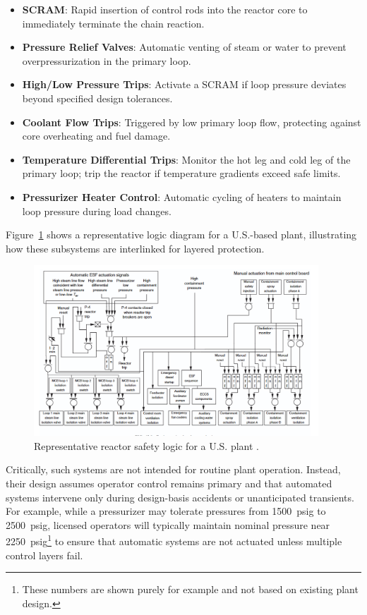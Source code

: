 \documentclass[12pt]{article}
\begin{document}
\begin{itemize}
  \item \textbf{SCRAM}: Rapid insertion of control rods into the reactor core to immediately terminate the chain reaction.
  \item \textbf{Pressure Relief Valves}: Automatic venting of steam or water to prevent overpressurization in the primary loop.
  \item \textbf{High/Low Pressure Trips}: Activate a SCRAM if loop pressure deviates beyond specified design tolerances.
  \item \textbf{Coolant Flow Trips}: Triggered by low primary loop flow, protecting against core overheating and fuel damage.
  \item \textbf{Temperature Differential Trips}: Monitor the hot leg and cold leg of the primary loop; trip the reactor if temperature gradients exceed safe limits.
  \item \textbf{Pressurizer Heater Control}: Automatic cycling of heaters to maintain loop pressure during load changes.
\end{itemize}

Figure~\ref{fig:flowlogic} shows a representative logic diagram for a U.S.-based plant, illustrating how these subsystems are interlinked for layered protection.

\begin{figure}[H]
  \centering
  \includegraphics[width=0.95\textwidth]{safetylogic.png}
  \caption{Representative reactor safety logic for a U.S. plant \cite{moderninstruments}.}
  \label{fig:flowlogic}
\end{figure}

Critically, such systems are not intended for routine plant operation. Instead, their design assumes operator control remains primary and that automated systems intervene only during design-basis accidents or unanticipated transients. For example, while a pressurizer may tolerate pressures from \SI{1500}{psig} to \SI{2500}{psig}, licensed operators will typically maintain nominal pressure near \SI{2250}{psig}\footnote{These numbers are shown purely for example and not based on existing plant design.} to ensure that automatic systems are not actuated unless multiple control layers fail.
\end{document}

